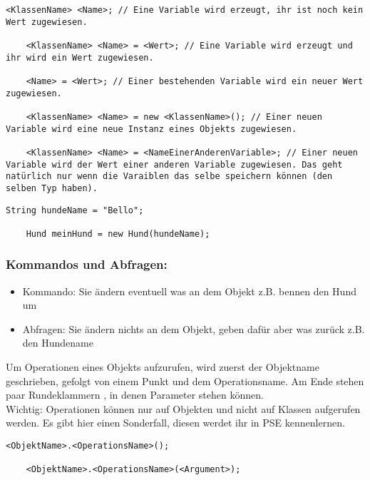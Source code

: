 \newpage

\begin{lstlisting}[title=\textbf{Variablen Syntax}]
	<KlassenName> <Name>; // Eine Variable wird erzeugt, ihr ist noch kein Wert zugewiesen.
	
	<KlassenName> <Name> = <Wert>; // Eine Variable wird erzeugt und ihr wird ein Wert zugewiesen.
	
	<Name> = <Wert>; // Einer bestehenden Variable wird ein neuer Wert zugewiesen.
	
	<KlassenName> <Name> = new <KlassenName>(); // Einer neuen Variable wird eine neue Instanz eines Objekts zugewiesen.
	
	<KlassenName> <Name> = <NameEinerAnderenVariable>; // Einer neuen Variable wird der Wert einer anderen Variable zugewiesen. Das geht natürlich nur wenn die Varaiblen das selbe speichern können (den selben Typ haben).
\end{lstlisting}
\begin{lstlisting}[title=\textbf{Variable Beispiel}]
	String hundeName = "Bello";
	
	Hund meinHund = new Hund(hundeName);
\end{lstlisting}
\begin{Infobox}
	\subsubsection*{Kommandos und Abfragen:}
	\begin{itemize}
		\item Kommando: Sie ändern eventuell was an dem Objekt z.B. bennen den Hund um
		\item Abfragen: Sie ändern nichts an dem Objekt, geben dafür aber was zurück z.B. den Hundename
	\end{itemize}
	Um Operationen eines Objekts aufzurufen, wird zuerst der Objektname geschrieben, gefolgt von einem Punkt und dem Operationsname.
	Am Ende stehen paar Rundeklammern \q{()}, in denen Parameter stehen können.\\
	{\color{red} Wichtig: } Operationen können nur auf Objekten und nicht auf Klassen aufgerufen werden.
	Es gibt hier einen Sonderfall, diesen werdet ihr in PSE kennenlernen.
\end{Infobox}
\begin{lstlisting}[title=\textbf{Kommando/Abfrage Syntax}]
	<ObjektName>.<OperationsName>();
	
	<ObjektName>.<OperationsName>(<Argument>);
\end{lstlisting}

